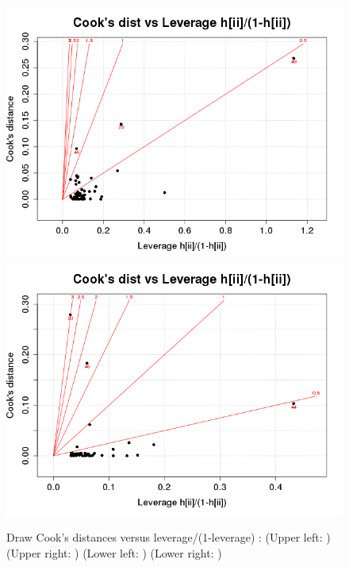 \begin{figure}[p]
\begin{center}
    \includegraphics[scale=0.4]{imgOT/model1-drawCookVsLeverages.png}\hspace*{1cm}
	\includegraphics[scale=0.4]{imgOT/model2-drawCookVsLeverages.png}\\
  \end{center}
  \caption{Draw Cook's distances versus leverage/(1-leverage) : \newline
    (Upper left: \textbf{\color{black}{model1: R output}}) (Upper right: \textbf{\color{black}{model2: R output}}) \newline
  (Lower left: \textbf{\color{blue}{model1: python output}})  (Lower right: \textbf{\color{blue}{model2: python output}}) }
\end{figure}

